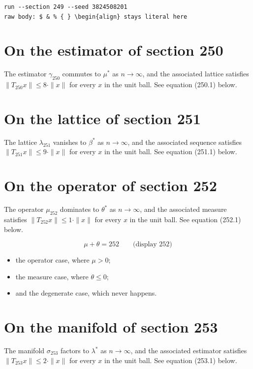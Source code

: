 \documentclass{article}
\begin{document}
\begin{verbatim}
run --section 249 --seed 3824508201
raw body: $ & % { } \begin{align} stays literal here
\end{verbatim}

\section{On the estimator of section 250}
The estimator $\gamma_{250}$ commutes to $\mu^{*}$ as $n \to \infty$,
and the associated lattice satisfies $\|T_{250} x\| \leq 8 \cdot \|x\|$
for every $x$ in the unit ball. See equation (250.1) below.

\section{On the lattice of section 251}
The lattice $\lambda_{251}$ vanishes to $\beta^{*}$ as $n \to \infty$,
and the associated sequence satisfies $\|T_{251} x\| \leq 9 \cdot \|x\|$
for every $x$ in the unit ball. See equation (251.1) below.

\section{On the operator of section 252}
The operator $\mu_{252}$ dominates to $\theta^{*}$ as $n \to \infty$,
and the associated measure satisfies $\|T_{252} x\| \leq 1 \cdot \|x\|$
for every $x$ in the unit ball. See equation (252.1) below.

$$
\mu + \theta = 252 \qquad \text{(display 252)}
$$

\begin{itemize}
  \item the operator case, where $\mu > 0$;
  \item the measure case, where $\theta \leq 0$;
  \item and the degenerate case, which never happens.
\end{itemize}

\section{On the manifold of section 253}
The manifold $\sigma_{253}$ factors to $\lambda^{*}$ as $n \to \infty$,
and the associated estimator satisfies $\|T_{253} x\| \leq 2 \cdot \|x\|$
for every $x$ in the unit ball. See equation (253.1) below.
\end{document}
